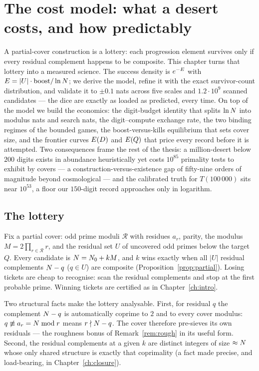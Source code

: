 \chapter{The cost model: what a desert costs, and how predictably}
\label{ch:costmodel}

\begin{chapterabstract}
A partial-cover construction is a lottery: each progression element
survives only if every residual complement happens to be composite. This
chapter turns that lottery into a measured science. The success density
is $e^{-E}$ with $E=|U|\cdot\mathrm{boost}/\ln N$; we derive the
model, refine it with the exact survivor-count distribution, and
validate it to $\pm0.1$ nats across five scales and $1.2\cdot10^9$
scanned candidates --- the dice are exactly as loaded as predicted, every
time. On top of the model we build the economics: the digit-budget
identity that splits $\ln N$ into modulus nats and search nats, the
digit--compute exchange rate, the two binding regimes of the bounded
games, the boost-versus-kills equilibrium that sets cover size, and the
frontier curves $E(D)$ and $E(Q)$ that price every record before it
is attempted. Two consequences frame the rest of the thesis: a
million-desert below $200$ digits exists in abundance heuristically yet
costs $10^{85}$ primality tests to exhibit by covers --- a
construction-versus-existence gap of fifty-nine orders of magnitude
beyond cosmological --- and the calibrated truth for $T(100\,000)$ sits
near $10^{53}$, a floor our $150$-digit record approaches only in
logarithm.
\end{chapterabstract}

\section{The lottery}\label{sec:lottery}

Fix a partial cover: odd prime moduli $\mathcal R$ with residues
$a_r$, parity, the modulus $M=2\prod_{r\in\mathcal R}r$, and the
residual set $U$ of uncovered odd primes below the target $Q$. Every
candidate is $N=N_0+kM$, and $k$ wins exactly when all $|U|$
residual complements $N-q$ ($q\in U$) are composite
(Proposition~\ref{prop:partial}). Losing tickets are cheap to recognise:
scan the residual complements and stop at the first probable prime.
Winning tickets are certified as in Chapter~\ref{ch:intro}.

Two structural facts make the lottery analysable. First, for residual
$q$ the complement $N-q$ is automatically coprime to $2$ and to every
cover modulus: $q\not\equiv a_r=N\bmod r$ means $r\nmid N-q$. The cover
therefore pre-sieves its own residuals --- the roughness bonus of
Remark~\ref{rem:rough} in its useful form. Second, the residual
complements at a given $k$ are distinct integers of size $\approx N$
whose only shared structure is exactly that coprimality (a fact made
precise, and load-bearing, in Chapter~\ref{ch:closure}).

